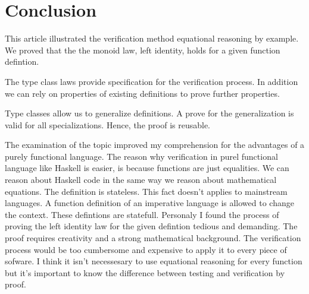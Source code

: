 
\section{Conclusion}

This article illustrated the verification method equational reasoning by example. We proved that the the monoid law, left identity, holds for a given function defintion. 

The type class laws provide specification for the verification process. In addition we can rely on properties of existing definitions to prove further properties.

Type classes allow us to generalize definitions. A prove for the generalization is valid for all specializations. Hence, the proof is reusable.

The examination of the topic improved my comprehension for the advantages of a purely functional language. The reason why verification in purel functional language like Haskell is easier, is because functions are just equalities. We can reason about Haskell code in the same way we reason about mathematical equations. The definition is stateless. This fact doesn't applies to mainstream languages. A function definition of an imperative language is allowed to change the context. These defintions are statefull.
Personaly I found the process of proving the left identity law for the given defintion tedious and demanding. The proof requires creativity and a strong mathematical background. The verification process would be too cumbersome and expensive to apply it to every piece of sofware. I think it isn't necessesary to use equational reasoning for every function but it's important to know the difference between testing and verification by proof.
